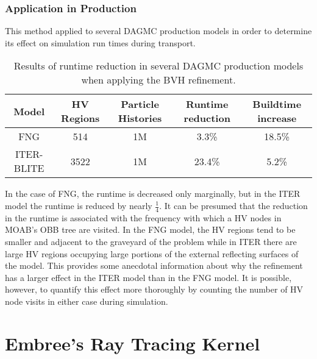 \subsubsection{Application in Production}

This method applied to several DAGMC production models in order to determine
its effect on simulation run times during transport.

\begin{table}[H]
  \centering
  \begin{tabular}{c c c c c}
    \toprule
    \textbf{Model} & \textbf{HV Regions} & \textbf{Particle Histories} & \textbf{Runtime reduction} & \textbf{Buildtime increase} \\
    \hline
    FNG            & 514                 & 1M                          & 3.3\%                      & 18.5\%                      \\
    ITER-BLITE     & 3522                & 1M                          & 23.4\%                     & 5.2\%                       \\
    \bottomrule
  \end{tabular}
  \caption{Results of runtime reduction in several DAGMC production models when applying the BVH refinement.}
  \label{tab:bvhrefine_production_results}
\end{table}    

In the case of FNG, the runtime is decreased only marginally, but in the ITER
model the runtime is reduced by nearly $\frac{1}{4}$. It can be presumed that
the reduction in the runtime is associated with the frequency with which a HV
nodes in MOAB's OBB tree are visited. In the FNG model, the HV regions tend to
be smaller and adjacent to the graveyard of the problem while in ITER there are
large HV regions occupying large portions of the external reflecting surfaces of
the model. This provides some anecdotal information about why the refinement has
a larger effect in the ITER model than in the FNG model. It is possible,
however, to quantify this effect more thoroughly by counting the number of HV
node visits in either case during simulation.

\section{Embree's Ray Tracing Kernel}\label{sec:emdag_hv_study}

